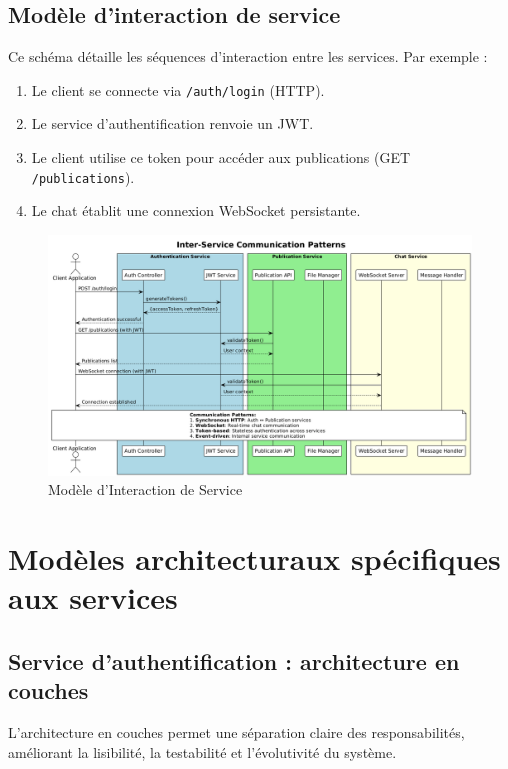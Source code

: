 \documentclass{rapportPfe}
\begin{document}
\FloatBarrier
\subsection{Modèle d'interaction de service}

Ce schéma détaille les séquences d’interaction entre les services. Par exemple :

\begin{enumerate}
    \item Le client se connecte via \texttt{/auth/login} (HTTP).
    \item Le service d’authentification renvoie un JWT.
    \item Le client utilise ce token pour accéder aux publications (GET \texttt{/publications}).
    \item Le chat établit une connexion WebSocket persistante.
\end{enumerate}

\begin{figure}[htbp]
    \centering
    \includegraphics[width=1.1\textwidth]{diagrams/diagram1.png}
    \caption{Modèle d’Interaction de Service}
    \label{fig:diagram1}
\end{figure}

\newpage
\FloatBarrier

\section{Modèles architecturaux spécifiques aux services}

\subsection{Service d’authentification : architecture en couches}
L’architecture en couches permet une séparation claire des responsabilités, améliorant la lisibilité, la testabilité et l’évolutivité du système.
\end{document}
